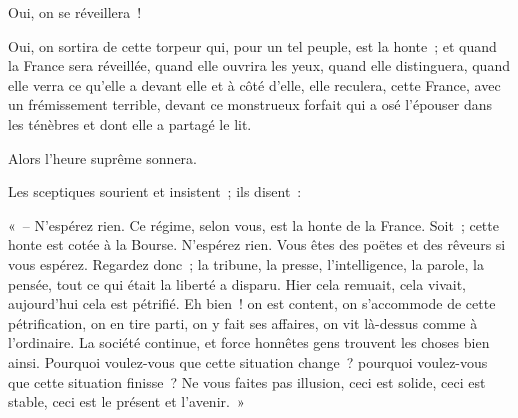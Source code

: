 \documentclass[french,twoside]{book} %
\newenvironment{quoteblock}%
  {\begin{quoting}}
  {\end{quoting}}
\newenvironment{quotebar}{%
    \def\FrameCommand{{\color{rubric!10!}\vrule width 0.5em} \hspace{0.9em}}%
    \def\OuterFrameSep{0pt} %
    \MakeFramed {\advance\hsize-\width \FrameRestore}
  }%
  {%
    \endMakeFramed
  }
\renewenvironment{quoteblock}%
  {%
    \savenotes
    \setstretch{0.9}
    \begin{quotebar}
    \smallskip
  }
  {%
    \smallskip
    \end{quotebar}
    \spewnotes
  }
\begin{document}
Oui, on se réveillera !\par
Oui, on sortira de cette torpeur qui, pour un tel peuple, est la honte ; et quand la France sera réveillée, quand elle ouvrira les yeux, quand elle distinguera, quand elle verra ce qu’elle a devant elle et à côté d’elle, elle reculera, cette France, avec un frémissement terrible, devant ce monstrueux forfait qui a osé l’épouser dans les ténèbres et dont elle a partagé le lit.\par
Alors l’heure suprême sonnera.\par
Les sceptiques sourient et insistent ; ils disent :\par

\begin{quoteblock}
 \noindent « – N’espérez rien. Ce régime, selon vous, est la honte de la France. Soit ; cette honte est cotée à la Bourse. N’espérez rien. Vous êtes des poëtes et des rêveurs si vous espérez. Regardez donc ; la tribune, la presse, l’intelligence, la parole, la pensée, tout ce qui était la liberté a disparu. Hier cela remuait, cela vivait, aujourd’hui cela est pétrifié. Eh bien ! on est content, on s’accommode de cette pétrification, on en tire parti, on y fait ses affaires, on vit là-dessus comme à l’ordinaire. La société continue, et force honnêtes gens trouvent les choses bien ainsi. Pourquoi voulez-vous que cette situation change ? pourquoi voulez-vous que cette situation finisse ? Ne vous faites pas illusion, ceci est solide, ceci est stable, ceci est le présent et l’avenir. »
 \end{quoteblock}
\end{document}
